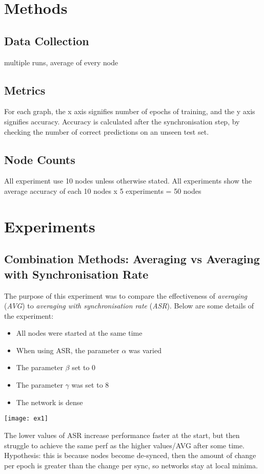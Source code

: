 \section{Methods}
\subsection{Data Collection}
multiple runs, average of every node
\subsection{Metrics}
For each graph, the x axis signifies number of epochs of training, and the y axis signifies accuracy. Accuracy is calculated after the synchronisation step, by checking the number of correct predictions on an unseen test set.
\subsection{Node Counts}
All experiment use 10 nodes unless otherwise stated. All experiments show the average accuracy of each 10 nodes x 5 experiments = 50 nodes

\section{Experiments}
\subsection{Combination Methods: Averaging vs Averaging with Synchronisation Rate}
The purpose of this experiment was to compare the effectiveness of \emph{averaging} (\emph{AVG}) to \emph{averaging with synchronisation rate} (\emph{ASR}). Below are some details of the experiment:

\begin{itemize}
	\item All nodes were started at the same time
	\item When using ASR, the parameter $\alpha$ was varied
	\item The parameter $\beta$ set to 0
	\item The parameter $\gamma$ was set to 8
	\item The network is dense
\end{itemize}

\texttt{[image: ex1]}

The lower values of ASR increase performance faster at the start, but then struggle to achieve the same perf as the higher values/AVG after some time. Hypothesis: this is because nodes become de-synced, then the amount of change per epoch is greater than the change per sync, so networks stay at local minima.

